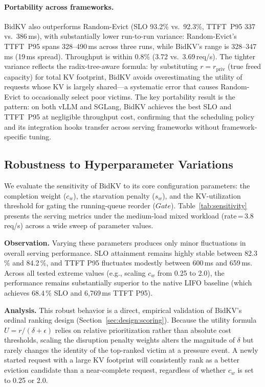 \documentclass[sigconf,nonacm]{acmart}
\newcommand{\bidkv}{BidKV\xspace}
\newcommand{\tokfree}{\ensuremath{r}}
\newcommand{\qualdelta}{\ensuremath{\delta}}
\begin{document}
\paragraph{Portability across frameworks.}
\bidkv also outperforms Random-Evict (SLO 93.2\% vs.~92.3\%, TTFT~P95
337 vs.~386\,ms), with substantially lower run-to-run variance:
Random-Evict's TTFT~P95 spans 328--490\,ms across three runs, while
\bidkv's range is 328--347\,ms (19\,ms spread).
Throughput is within 0.8\% (3.72 vs.~3.69\,req/s).
The tighter variance reflects the radix-tree-aware formula: by substituting
$\tokfree = r_{\mathrm{priv}}$ (true freed capacity) for total KV
footprint, \bidkv avoids overestimating the utility of requests whose KV
is largely shared---a systematic error that causes Random-Evict to
occasionally select poor victims.
The key portability result is the pattern: on both vLLM and SGLang,
\bidkv achieves the best SLO and TTFT~P95 at negligible throughput cost,
confirming that the scheduling policy and its integration hooks transfer
across serving frameworks without framework-specific tuning.

\subsection{Robustness to Hyperparameter Variations}
\label{sec:eval:robustness}

We evaluate the sensitivity of \bidkv to its core configuration parameters: the completion weight ($c_w$), the starvation penalty ($s_w$), and the KV-utilization threshold for gating the running-queue reorder ($Gate$). Table~\ref{tab:sensitivity} presents the serving metrics under the medium-load mixed workload (rate\,=\,3.8\,req/s) across a wide sweep of parameter values.

\textbf{Observation.} Varying these parameters produces only minor fluctuations in overall serving performance. SLO attainment remains highly stable between 82.3\,\% and 84.2\,\%, and TTFT P95 fluctuates modestly between 600\,ms and 659\,ms. Across all tested extreme values (e.g., scaling $c_w$ from 0.25 to 2.0), the performance remains substantially superior to the native LIFO baseline (which achieves 68.4\,\% SLO and 6{,}769\,ms TTFT P95).

\textbf{Analysis.} This robust behavior is a direct, empirical validation of \bidkv's ordinal ranking design (Section~\ref{sec:design:scoring}). Because the utility formula $U = r / (\qualdelta + \epsilon)$ relies on relative prioritization rather than absolute cost thresholds, scaling the disruption penalty weights alters the magnitude of $\qualdelta$ but rarely changes the identity of the top-ranked victim at a pressure event. A newly started request with a large KV footprint will consistently rank as a better eviction candidate than a near-complete request, regardless of whether $c_w$ is set to 0.25 or 2.0.
\end{document}
